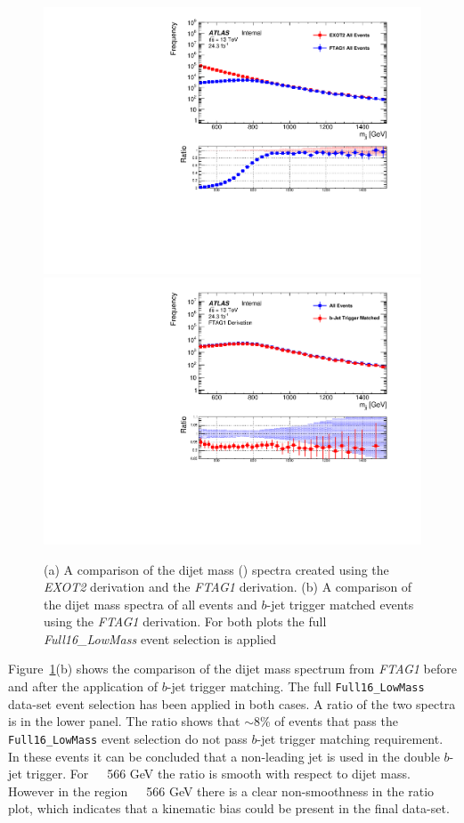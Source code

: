 \begin{figure}[!ht]
  \begin{center}
    \captionsetup[subfigure]{aboveskip=0pt,justification=centering}
    \subcaptionbox{} {\includegraphics[width=0.5\linewidth, angle=0]{figs/Dibjet/LowMass/evt-trigmatch_exot2.pdf} }\hspace{-5mm}
    \subcaptionbox{} {\includegraphics[width=0.5\linewidth, angle=0]{figs/Dibjet/LowMass/evt-trigmatch_ftag1.pdf} }
  \end{center}
  \caption{(a) A comparison of the dijet mass (\mjj) spectra created using the \textit{EXOT2} derivation and the \textit{FTAG1} derivation.
    (b) A comparison of the dijet mass spectra of all events and $b$-jet trigger matched events using the \textit{FTAG1} derivation.
    For both plots the full \textit{Full16\_LowMass} event selection is applied }
     \label{fig:evt-btrig_match}
\end{figure}

Figure~\ref{fig:evt-btrig_match}(b) shows the comparison of the dijet mass spectrum from \textit{FTAG1}
before and after the application of $b$-jet trigger matching.
The full \verb|Full16_LowMass| data-set event selection has been applied in both cases.
A ratio of the two spectra is in the lower panel.
The ratio shows that $\sim$8\% of events that
pass the \verb|Full16_LowMass| event selection do not pass $b$-jet trigger matching requirement.
In these events it can be concluded that a non-leading jet is used in the double $b$-jet trigger.
For~\mjj~\gt~566 GeV the ratio is smooth with respect to dijet mass.
However in the region~\mjj~\lt~566 GeV there is a clear non-smoothness in the ratio plot,
which indicates that a kinematic bias could be present in the final data-set.

